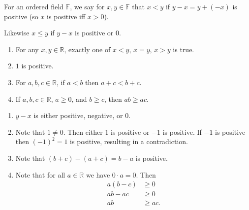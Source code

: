 \documentclass{notes}
\begin{document}
\newpage

\underline{}

\begin{defn}
  For an ordered field $\mathbb F$, we say for $x, y \in \mathbb F$ that {\boldmath \bfseries $x < y$} if $y - x = y + (-x)$ is positive (so $x$ is positive iff $x > 0$).

  Likewise {\boldmath \bfseries $x \leq y$} if $y - x$ is positive or $0$.
\end{defn}

\begin{lem}
  \begin{enumerate}
    \item For any $x, y \in \mathbb R$, exactly one of $x < y$, $x = y$, $x > y$ is true.

    \item $1$ is positive.

    \item For $a, b, c \in \mathbb R$, if $a < b$ then $a + c < b + c$.

    \item If $a, b, c \in \mathbb R$, $a \geq 0$, and $b \geq c$, then $a b \geq a c$.
  \end{enumerate}
\end{lem}

\begin{prf}
  \begin{enumerate}
    \item $y - x$ is either positive, negative, or $0$.

    \item Note that $1 \neq 0$.
    Then either $1$ is positive or $-1$ is positive.
    If $-1$ is positive then $(-1)^2 = 1$ is positive, resulting in a contradiction.

    \item Note that $(b + c) - (a + c) = b - a$ is positive.

    \item Note that for all $a \in \mathbb R$ we have $0 \cdot a = 0$.
    Then 
    \begin{align*}
      a (b - c) &\geq 0 \\ 
      a b - a c &\geq 0 \\ 
      a b &\geq a c.
    \end{align*}
  \end{enumerate}
\end{prf}
\end{document}
